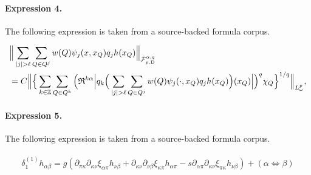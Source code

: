 \documentclass[11pt]{article}
\begin{document}
\paragraph{Expression 4.} The following expression is taken from a source-backed formula corpus.

\begin{align*}&\Big\|\sum_{|j|>\ell} \sum_{Q\in Q^j}w(Q) \psi_{j}(x,x_{Q})q_{j}h(x_{Q})\Big\|_{\dot{\mathcal F}^{\alpha,q}_{p,{\rm D}}} \\&=C\Big\|\Big\{\sum_{k\in \mathbb Z}\sum_{Q\in Q^k} \Big({\mathfrak R}^{k\alpha}\Big|q_k\Big(\sum_{|j|>\ell} \sum_{Q\in Q^j}w(Q) \psi_{j}(\cdot,x_{Q})q_{j}h(x_{Q})\Big)(x_Q)\Big|\Big)^q\chi_Q\Big\}^{1/q}\Big\|_{L^p_\omega},\end{align*}

\paragraph{Expression 5.} The following expression is taken from a source-backed formula corpus.

\begin{align*}\begin{array}{l}\delta _1^{(1)} h_{\alpha \beta } = g(\partial _{\pi \kappa }\partial _{\kappa \nu } \xi _{\alpha \pi } h_{\nu \beta } +\partial _{\kappa \nu } \partial _{\nu \beta } \xi _{\kappa \pi }h_{\alpha \pi } - s\partial _{\alpha \pi } \partial _{\kappa \nu} \xi _{\pi \kappa } h_{\nu \beta } ) + (\alpha \Leftrightarrow\beta )\end{array}\end{align*}
\end{document}
